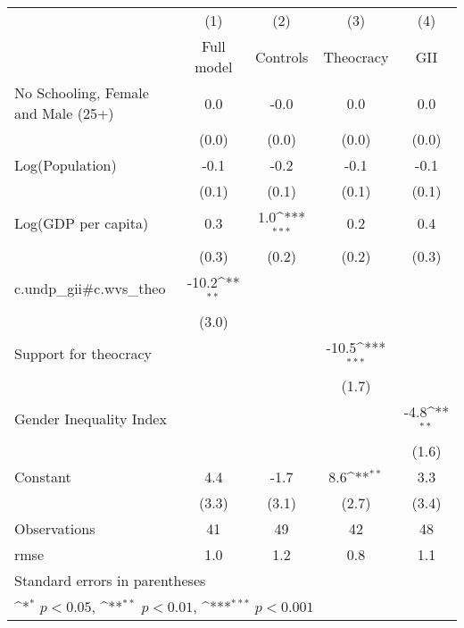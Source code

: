 {
\def\sym#1{\ifmmode^{#1}\else\(^{#1}\)\fi}
\begin{tabular}{l*{4}{c}}
\hline\hline
                    &\multicolumn{1}{c}{(1)}&\multicolumn{1}{c}{(2)}&\multicolumn{1}{c}{(3)}&\multicolumn{1}{c}{(4)}\\
                    &\multicolumn{1}{c}{Full model}&\multicolumn{1}{c}{Controls}&\multicolumn{1}{c}{Theocracy}&\multicolumn{1}{c}{GII}\\
\hline
No Schooling, Female and Male (25+)&         0.0         &        -0.0         &         0.0         &         0.0         \\
                    &       (0.0)         &       (0.0)         &       (0.0)         &       (0.0)         \\
[1em]
Log(Population)     &        -0.1         &        -0.2         &        -0.1         &        -0.1         \\
                    &       (0.1)         &       (0.1)         &       (0.1)         &       (0.1)         \\
[1em]
Log(GDP per capita) &         0.3         &         1.0\sym{***}&         0.2         &         0.4         \\
                    &       (0.3)         &       (0.2)         &       (0.2)         &       (0.3)         \\
[1em]
c.undp\_gii#c.wvs\_theo&       -10.2\sym{**} &                     &                     &                     \\
                    &       (3.0)         &                     &                     &                     \\
[1em]
Support for theocracy&                     &                     &       -10.5\sym{***}&                     \\
                    &                     &                     &       (1.7)         &                     \\
[1em]
Gender Inequality Index&                     &                     &                     &        -4.8\sym{**} \\
                    &                     &                     &                     &       (1.6)         \\
[1em]
Constant            &         4.4         &        -1.7         &         8.6\sym{**} &         3.3         \\
                    &       (3.3)         &       (3.1)         &       (2.7)         &       (3.4)         \\
\hline
Observations        &          41         &          49         &          42         &          48         \\
rmse                &         1.0         &         1.2         &         0.8         &         1.1         \\
\hline\hline
\multicolumn{5}{l}{\footnotesize Standard errors in parentheses}\\
\multicolumn{5}{l}{\footnotesize \sym{*} \(p<0.05\), \sym{**} \(p<0.01\), \sym{***} \(p<0.001\)}\\
\end{tabular}
}
